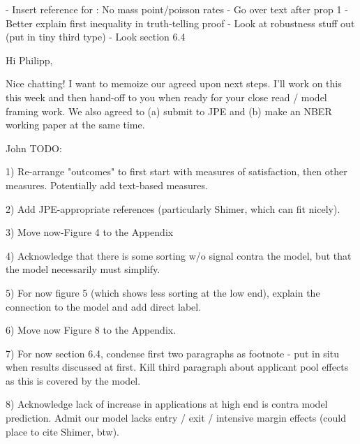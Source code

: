-	Insert reference for : No mass point/poisson rates
-	Go over text after prop 1
-	Better explain first inequality in truth-telling proof
-	Look at robustness stuff out (put in tiny third type)
-	Look section 6.4



Hi Philipp, 

Nice chatting! I want to memoize our agreed upon next steps. I'll work on this this week and then hand-off to you when ready for your close read / model framing work. We also agreed to (a) submit to JPE and (b) make an NBER working paper at the same time. 

John TODO: 

1) Re-arrange "outcomes" to first start with measures of satisfaction, then other measures. Potentially add text-based measures. 

2) Add JPE-appropriate references (particularly Shimer, which can fit nicely). 

3) Move now-Figure 4 to the Appendix 

4) Acknowledge that there is some sorting w/o signal contra the model, but that the model necessarily must simplify. 

5) For now figure 5 (which shows less sorting at the low end), explain the connection to the model and add direct label. 

6) Move now Figure 8 to the Appendix. 

7) For now section 6.4, condense first two paragraphs as footnote - put in situ when results discussed at first. Kill third paragraph about applicant pool effects  as this is covered by the model. 

8) Acknowledge lack of increase in applications at high end is contra model prediction. Admit our model lacks entry / exit / intensive margin effects (could place to cite Shimer, btw). 


	
	
	
